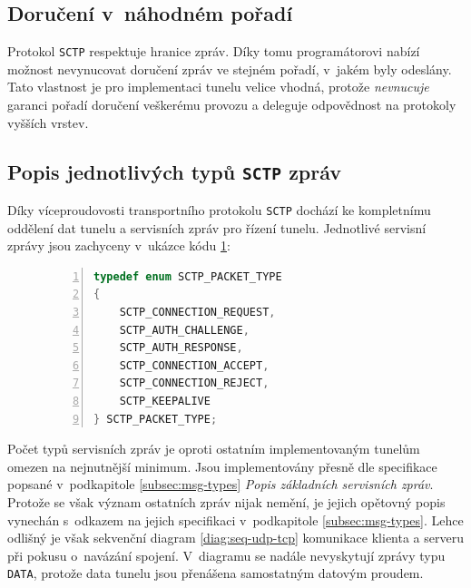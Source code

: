 \documentclass[thesis=M,czech]{FITthesis}[2012/10/20]
\begin{document}
    \subsection{Doručení v~náhodném pořadí}
    \label{subsec:sctp-unordered-delivery}
    
    Protokol \texttt{SCTP} respektuje hranice zpráv. Díky tomu programátorovi nabízí možnost nevynucovat doručení zpráv ve stejném pořadí, v~jakém byly odeslány. Tato vlastnost je pro implementaci tunelu velice vhodná, protože \textit{nevnucuje} garanci pořadí doručení veškerému provozu a deleguje odpovědnost na protokoly vyšších vrstev.
    
    
    
    
  
    \subsection{Popis jednotlivých typů \texttt{SCTP} zpráv}
        
    Díky víceproudovosti transportního protokolu \texttt{SCTP} dochází ke kompletnímu oddělení dat tunelu a servisních zpráv pro řízení tunelu. Jednotlivé servisní zprávy jsou zachyceny v~ukázce kódu \ref{code:sctp-types}:
        
    \begin{figure}[h]
	\begin{lstlisting}[caption=Výňatek souboru \texttt{plugins/sctp/packet.h} definující typy \texttt{SCTP} zpráv,language=c,frame=single,numbers=left]
typedef enum SCTP_PACKET_TYPE
{
	SCTP_CONNECTION_REQUEST,
	SCTP_AUTH_CHALLENGE,
	SCTP_AUTH_RESPONSE,
	SCTP_CONNECTION_ACCEPT,
	SCTP_CONNECTION_REJECT,
	SCTP_KEEPALIVE
} SCTP_PACKET_TYPE;
      \end{lstlisting}
      \label{code:sctp-types}
    \end{figure}
    
    Počet typů servisních zpráv je oproti ostatním implementovaným tunelům omezen na nejnutnější minimum. Jsou implementovány přesně dle specifikace popsané v~podkapitole \ref{subsec:msg-types} \textit{Popis základních servisních zpráv}. Protože se však význam ostatních zpráv nijak nemění, je jejich opětovný popis vynechán s~odkazem na jejich specifikaci v~podkapitole \ref{subsec:msg-types}. Lehce odlišný je však sekvenční diagram \ref{diag:seq-udp-tcp} komunikace klienta a serveru při pokusu o~navázání spojení. V~diagramu se nadále nevyskytují zprávy typu \texttt{DATA}, protože data tunelu jsou přenášena samostatným datovým proudem.
    
\end{document}
